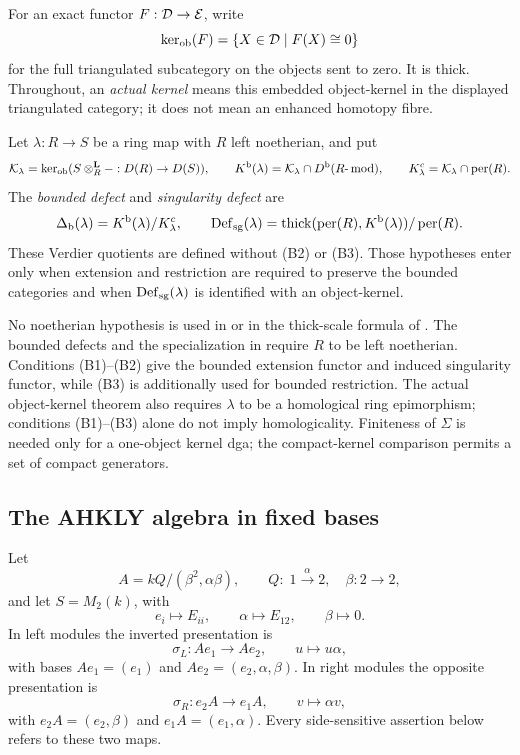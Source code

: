 \begin{definition}\label{def:object-kernel}
For an exact functor \(F:\mathcal D\to\mathcal E\), write
\[
 \ker_{\mathrm{ob}}(F)=\{X\in\mathcal D\mid F(X)\cong0\}
\]
for the full triangulated subcategory on the objects sent to zero.  It is thick.  Throughout, an \emph{actual kernel} means this embedded object-kernel in the displayed triangulated category; it does not mean an enhanced homotopy fibre.
\end{definition}

\begin{definition}\label{def:singularity-defect}
Let \(\lambda:R\to S\) be a ring map with \(R\) left noetherian, and put
\[
 \mathcal K_\lambda=\ker_{\mathrm{ob}}(S\otimes^{\mathbf L}_R-:D(R)\to D(S)),
 \qquad
 K^{\mathrm b}(\lambda)=\mathcal K_\lambda\cap D^{\mathrm b}(R\text{-}\operatorname{mod}),
 \qquad
 K^c_\lambda=\mathcal K_\lambda\cap\operatorname{per}(R).
\]
The \emph{bounded defect} and \emph{singularity defect} are
\[
 \Delta_{\mathrm b}(\lambda)=K^{\mathrm b}(\lambda)/K^c_\lambda,
 \qquad
 \operatorname{Def}_{\mathrm{sg}}(\lambda)=\operatorname{thick}(\operatorname{per}(R),K^{\mathrm b}(\lambda))/\operatorname{per}(R).
\]
These Verdier quotients are defined without \textup{(B2)} or \textup{(B3)}.  Those hypotheses enter only when extension and restriction are required to preserve the bounded categories and when \(\operatorname{Def}_{\mathrm{sg}}(\lambda)\) is identified with an object-kernel.
\end{definition}

No noetherian hypothesis is used in  or in the thick-scale formula of .  The bounded defects and the specialization in  require \(R\) to be left noetherian.  Conditions \textup{(B1)--(B2)} give the bounded extension functor and induced singularity functor, while \textup{(B3)} is additionally used for bounded restriction.  The actual object-kernel theorem also requires \(\lambda\) to be a homological ring epimorphism; conditions \textup{(B1)--(B3)} alone do not imply homologicality.  Finiteness of \(\Sigma\) is needed only for a one-object kernel dga; the compact-kernel comparison permits a set of compact generators.

\subsection*{The AHKLY algebra in fixed bases}
Let
\[
 A=kQ/(\beta^2,\alpha\beta),\qquad
 Q:\;1\xrightarrow{\alpha}2,\quad \beta:2\to2,
\]
and let \(S=M_2(k)\), with
\[
 e_i\mapsto E_{ii},\qquad \alpha\mapsto E_{12},\qquad \beta\mapsto0.
\]
In left modules the inverted presentation is
\[
 \sigma_L:Ae_1\longrightarrow Ae_2,\qquad u\longmapsto u\alpha,
\]
with bases \(Ae_1=(e_1)\) and \(Ae_2=(e_2,\alpha,\beta)\).  In right modules the opposite presentation is
\[
 \sigma_R:e_2A\longrightarrow e_1A,\qquad v\longmapsto\alpha v,
\]
with \(e_2A=(e_2,\beta)\) and \(e_1A=(e_1,\alpha)\).  Every side-sensitive assertion below refers to these two maps.

